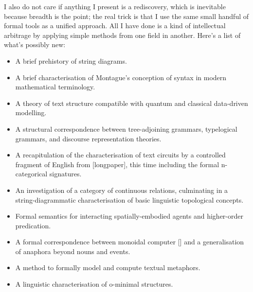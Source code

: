  I also do not care if anything I present is a rediscovery, which is inevitable because breadth is the point; the real trick is that I use the same small handful of formal tools as a unified approach. All I have done is a kind of intellectual arbitrage by applying simple methods from one field in another. Here's a list of what's possibly new:

\begin{itemize}
\item{A brief prehistory of string diagrams.}
\item{A brief characterisation of Montague's conception of syntax in modern mathematical terminology.}
\item{A theory of text structure compatible with quantum and classical data-driven modelling.}
\item{A structural correspondence between tree-adjoining grammars, typelogical grammars, and discourse representation theories.}
\item{A recapitulation of the characterisation of text circuits by a controlled fragment of English from [longpaper], this time including the formal n-categorical signatures.}
\item{An investigation of a category of continuous relations, culminating in a string-diagrammatic characterisation of basic linguistic topological concepts.}
\item{Formal semantics for interacting spatially-embodied agents and higher-order predication.}
\item{A formal correspondence between monoidal computer [] and a generalisation of anaphora beyond nouns and events.}
\item{A method to formally model and compute textual metaphors.}
\item{A linguistic characterisation of o-minimal structures.}
\end{itemize}

